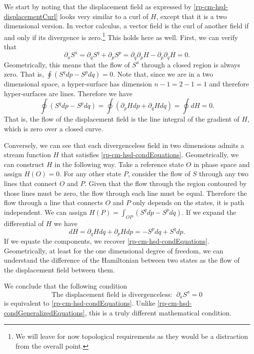We start by noting that the displacement field as expressed by \ref{rp-cm-hsd-displacementCurl} looks very similar to a curl of $H$, except that it is a two dimensional version. In vector calculus, a vector field is the curl of another field if and only if its divergence is zero.\footnote{We will leave for now topological requirements as they would be a distraction from the overall point.} This holds here as well. First, we can verify that
\begin{equation}
	\partial_a S^a = \partial_q S^q + \partial_p S^p = \partial_q \partial_p H - \partial_p \partial_q H = 0.
\end{equation}
Geometrically, this means that the flow of $S^a$ through a closed region is always zero. That is, $\oint \left( S^q dp - S^p dq \right) = 0$. Note that, since we are in a two dimensional space, a hyper-surface has dimension $n-1 = 2-1 = 1$ and therefore hyper-surfaces are lines. Therefore we have 
\begin{equation}
	\oint \left( S^q dp - S^p dq \right) = \oint \left( \partial_p H dp + \partial_q H dq \right) = \oint dH = 0.
\end{equation}
That is, the flow of the displacement field is the line integral of the gradient of $H$, which is zero over a closed curve.

Conversely, we can see that each divergenceless field in two dimensions admits a stream function $H$ that satisfies \ref{rp-cm-hsd-condEquations}. Geometrically, we can construct $H$ in the following way. Take a reference state $O$ in phase space and assign $H(O) = 0$. For any other state $P$, consider the flow of $S$ through any two lines that connect $O$ and $P$. Given that the flow through the region contoured by those lines must be zero, the flow through each line must be equal. Therefore the flow through a line that connects $O$ and $P$ only depends on the states, it is path independent. We can assign $H(P) = \int_{OP} \left( S^q dp - S^p dq \right)$. If we expand the differential of $H$ we have
\begin{equation}
	dH = \partial_q H dq + \partial_p H dp = - S^p dq + S^q dp.
\end{equation}
If we equate the components, we recover \ref{rp-cm-hsd-condEquations}. Geometrically, at least for the one dimensional degree of freedom, we can understand the difference of the Hamiltonian between two states as the flow of the displacement field between them.

We conclude that the following condition
\begin{equation}\label{rp-cm-hsd-condDivergenceDisplacement}
	\tag{HM-2}
	\text{The displacement field is divergenceless: } \; \partial_a S^a = 0
\end{equation}
is equivalent to \ref{rp-cm-hsd-condEquations}. Unlike \ref{rp-cm-hsd-condGeneralizedEquations}, this is a truly different mathematical condition.

